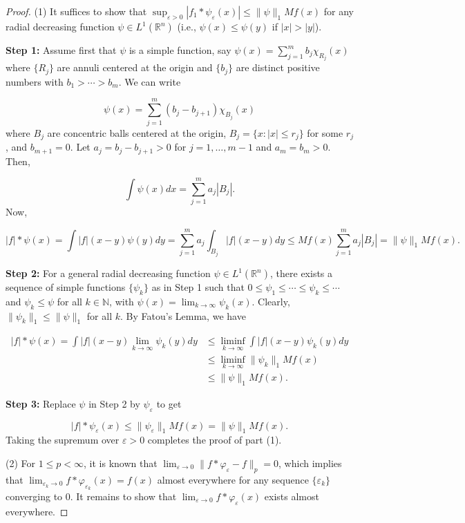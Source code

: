 \documentclass[12pt,openany]{book}
\theoremstyle{definition}
\begin{document}
\begin{proof}
    


(1) It suffices to show that $\sup_{\varepsilon>0}|f_1 * \psi_{\varepsilon}(x)| \leqslant \|\psi\|_1 Mf(x)$ for any radial decreasing function $\psi \in L^1(\mathbb{R}^n)$ (i.e., $\psi(x) \leqslant \psi(y)$ if $|x| > |y|$).

\textbf{Step 1:} Assume first that $\psi$ is a simple function, say $\psi(x)=\sum_{j=1}^m b_j \chi_{R_j}(x)$ where $\{R_j\}$ are annuli centered at the origin and $\{b_j\}$ are distinct positive numbers with $b_1 > \cdots > b_m$. We can write

$$\psi(x) = \sum_{j=1}^m (b_j - b_{j+1}) \chi_{B_j}(x)$$where $B_j$ are concentric balls centered at the origin, $B_j = \{x: |x| \leqslant r_j\}$ for some $r_j$, and $b_{m+1}=0$. Let $a_j = b_j - b_{j+1} > 0$ for $j=1,\ldots,m-1$ and $a_m = b_m > 0$. Then,

$$\int \psi(x) dx = \sum_{j=1}^m a_j |B_j|.$$Now,

$$|f| * \psi(x) = \int |f|(x-y) \psi(y) dy = \sum_{j=1}^m a_j \int_{B_j} |f|(x-y) dy \leqslant Mf(x) \sum_{j=1}^m a_j |B_j| = \|\psi\|_1 Mf(x).$$

\textbf{Step 2:} For a general radial decreasing function $\psi \in L^1(\mathbb{R}^n)$, there exists a sequence of simple functions $\{\psi_k\}$ as in Step 1 such that $0 \leqslant \psi_1 \leqslant \cdots \leqslant \psi_k \leqslant \cdots$ and $\psi_k \leqslant \psi$ for all $k \in \mathbb{N}$, with $\psi(x) = \lim_{k \rightarrow \infty} \psi_k(x)$. Clearly, $\|\psi_k\|_1 \leqslant \|\psi\|_1$ for all $k$. By Fatou's Lemma, we have

$$\begin{aligned}
    |f| * \psi(x) = \int |f|(x-y) \lim_{k \rightarrow \infty} \psi_k(y) dy &\leqslant \liminf_{k \rightarrow \infty} \int |f|(x-y) \psi_k(y) dy \\
    &\leqslant \liminf_{k \rightarrow \infty} \|\psi_k\|_1 Mf(x)\\
    &\leqslant \|\psi\|_1 Mf(x).
\end{aligned}$$

\textbf{Step 3:} Replace $\psi$ in Step 2 by $\psi_{\varepsilon}$ to get

$$|f| * \psi_{\varepsilon}(x) \leqslant \|\psi_{\varepsilon}\|_1 Mf(x) = \|\psi\|_1 Mf(x).$$Taking the supremum over $\varepsilon > 0$ completes the proof of part (1).

(2) For $1 \leqslant p < \infty$, it is known that $\lim_{\varepsilon \rightarrow 0} \|f * \varphi_{\varepsilon} - f\|_p = 0$, which implies that $\lim_{\varepsilon_k \rightarrow 0} f * \varphi_{\varepsilon_k}(x) = f(x)$ almost everywhere for any sequence $\{\varepsilon_k\}$ converging to 0. It remains to show that $\lim_{\varepsilon \rightarrow 0} f * \varphi_{\varepsilon}(x)$ exists almost everywhere.


\end{proof}
\end{document}

